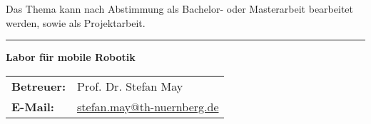 \documentclass{ohm_project_description}
\begin{document}
\vspace{0.5cm}
Das Thema kann nach Abstimmung als Bachelor- oder Masterarbeit bearbeitet werden, sowie als Projektarbeit. 


\vfill
\textcolor{ohm_red}{\rule{\linewidth}{0.4mm}}
\textbf{\textcolor{ohm_red}{Labor für mobile Robotik}} \\
\begin{tabular}{@{}ll}
\textbf{Betreuer:} & Prof. Dr. Stefan May \\
\textbf{E-Mail:}   & \href{mailto:stefan.may@th-nuernberg.de}{stefan.may@th-nuernberg.de} \\
\end{tabular}
\end{document}
